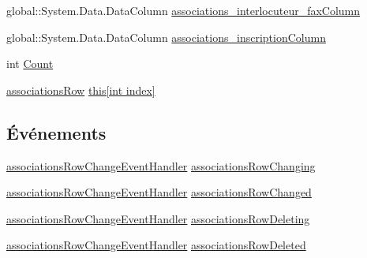 \begin{DoxyCompactItemize}
\item 
global\+::\+System.\+Data.\+Data\+Column \hyperlink{classforma_1_1formadb_data_set_1_1associations_data_table_a34ca6cd6af8777a6b24419a3c7f57015}{associations\+\_\+interlocuteur\+\_\+fax\+Column}
\item 
global\+::\+System.\+Data.\+Data\+Column \hyperlink{classforma_1_1formadb_data_set_1_1associations_data_table_ac31aaaa8fe3587ff6c47eb81a4ee5391}{associations\+\_\+inscription\+Column}
\item 
int \hyperlink{classforma_1_1formadb_data_set_1_1associations_data_table_a78343670c4539cccd088864ab0f68b97}{Count}
\item 
\hyperlink{classforma_1_1formadb_data_set_1_1associations_row}{associations\+Row} \hyperlink{classforma_1_1formadb_data_set_1_1associations_data_table_a8704a7018e0f37ea17db89add49e75b2}{this\mbox{[}int index\mbox{]}}
\end{DoxyCompactItemize}
\subsection*{Événements}
\begin{DoxyCompactItemize}
\item 
\hyperlink{classforma_1_1formadb_data_set_aab4b0f2eede2713421e7fb19cd2e5674}{associations\+Row\+Change\+Event\+Handler} \hyperlink{classforma_1_1formadb_data_set_1_1associations_data_table_ad7c46ad897da07820260100321351eb2}{associations\+Row\+Changing}
\item 
\hyperlink{classforma_1_1formadb_data_set_aab4b0f2eede2713421e7fb19cd2e5674}{associations\+Row\+Change\+Event\+Handler} \hyperlink{classforma_1_1formadb_data_set_1_1associations_data_table_a96ce3c1b304a836513f8ea3f20ad7dc2}{associations\+Row\+Changed}
\item 
\hyperlink{classforma_1_1formadb_data_set_aab4b0f2eede2713421e7fb19cd2e5674}{associations\+Row\+Change\+Event\+Handler} \hyperlink{classforma_1_1formadb_data_set_1_1associations_data_table_af8d6d7f888774fbeaa2adefb87e2e137}{associations\+Row\+Deleting}
\item 
\hyperlink{classforma_1_1formadb_data_set_aab4b0f2eede2713421e7fb19cd2e5674}{associations\+Row\+Change\+Event\+Handler} \hyperlink{classforma_1_1formadb_data_set_1_1associations_data_table_a322b2488c3bffbe4e029d799e04ac419}{associations\+Row\+Deleted}
\end{DoxyCompactItemize}


